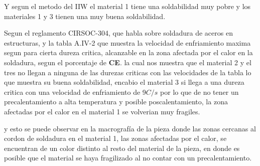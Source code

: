 \documentclass[12pt,a4paper]{article}
\begin{document}
Y segun el metodo del IIW el material 1 tiene una soldabilidad muy pobre y los materiales 1 y 3 tienen una muy buena soldabilidad.

Segun el reglamento CIRSOC-304, que habla sobre soldadura de aceros en estructuras, y la tabla A.IV-2 que muestra la velocidad de enfriamiento maxima segun para cierta dureza critica, alcanzable en la zona afectada por el calor en la soldadura, segun el porcentaje de \textbf{CE}. la cual nos muestra que el material 2 y el tres no llegan a ninguna de las durezas criticas con las velocidades de la tabla lo que muestra su buena soldabilidad, encabio el material 3 si llega a una dureza critica con una velocidad de enfriamiento de 9$C/s$ por lo que de no tener un precalentamiento a alta temperatura y posible poscalentamiento, la zona afectadas por el calor en el material 1 se volverian muy fragiles.

y esto se puede observar en la macrografía de la pieza donde las zonas cercanas al cordon de soldadura en el material 1, las zonas afectadas por el calor, se encuentran de un color distinto al resto del material de la pieza, en donde es posible que el material se haya fragilizado al no contar con un precalentamiento.
\end{document}
